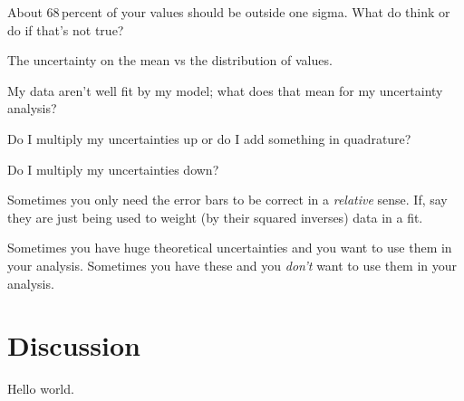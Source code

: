 \documentclass[12pt, letterpaper]{article}
\begin{document}
About 68\,percent of your values should be outside one sigma. What do think
or do if that's not true?

The uncertainty on the mean vs the distribution of values.

My data aren't well fit by my model; what does that mean for my uncertainty
analysis?

Do I multiply my uncertainties up or do I add something in quadrature?

Do I multiply my uncertainties down?

Sometimes you only need the error bars to be correct in a
\emph{relative} sense. If, say they are just being used to weight (by
their squared inverses) data in a fit.

Sometimes you have huge theoretical uncertainties and you want to use
them in your analysis. Sometimes you have these and you \emph{don't} want
to use them in your analysis.

\section{Discussion}

Hello world.
\end{document}
